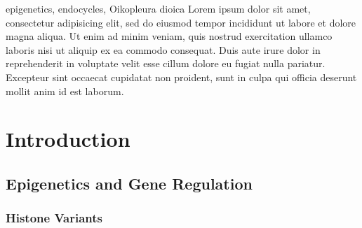 \documentclass[11pt,twoside,a4paper]{report}
\begin{document}
\cleardoublepage


\TitlePage
    \vspace*{55mm}
        {epigenetics, endocycles, Oikopleura dioica}
		{Lorem ipsum dolor sit amet, consectetur adipisicing elit, sed do eiusmod tempor incididunt ut labore et dolore magna aliqua. Ut enim ad minim veniam, quis nostrud exercitation ullamco laboris nisi ut aliquip ex ea commodo consequat. Duis aute irure dolor in reprehenderit in voluptate velit esse cillum dolore eu fugiat nulla pariatur. Excepteur sint occaecat cupidatat non proident, sunt in culpa qui officia deserunt mollit anim id est laborum.}
\EndTitlePage

\cleardoublepage



\tableofcontents
\cleardoublepage

\listoffigures
\cleardoublepage

\listoftables
\cleardoublepage

\chapter{Introduction}

	\section{Epigenetics and Gene Regulation}
	

		\subsection{Histone Variants}
		
\end{document}
